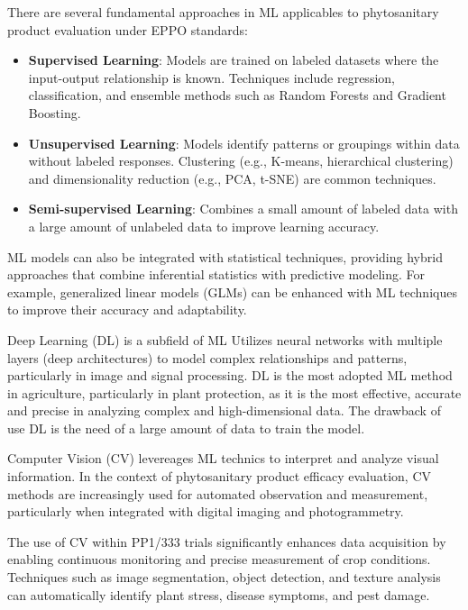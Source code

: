 \documentclass[12pt,a4paper,oneside]{report}
\begin{document}
There are several fundamental approaches in ML applicables to phytosanitary product
evaluation under EPPO standards:

\begin{itemize}
    \item \textbf{Supervised Learning}: Models are trained on labeled datasets where 
    the input-output relationship is known. Techniques include regression, classification, 
    and ensemble methods such as Random Forests and Gradient Boosting.
    \item \textbf{Unsupervised Learning}: Models identify patterns or groupings within 
    data without labeled responses. Clustering (e.g., K-means, hierarchical clustering) 
    and dimensionality reduction (e.g., PCA, t-SNE) are common techniques.
    \item \textbf{Semi-supervised Learning}: Combines a small amount of labeled data with 
    a large amount of unlabeled data to improve learning accuracy.
\end{itemize}

ML models can also be integrated with statistical techniques, providing hybrid approaches that 
combine inferential statistics with predictive modeling. For example, generalized linear models 
(GLMs) can be enhanced with ML techniques to improve their accuracy and adaptability.

Deep Learning (DL) is a subfield of ML Utilizes neural networks with multiple layers 
(deep architectures) to model complex relationships and patterns, particularly 
in image and signal processing.
DL is the most adopted ML method in agriculture, particularly in plant protection,
as it is the most effective, accurate and precise in analyzing complex and high-dimensional data.
The drawback of use DL is the need of a large amount of data to train the model.

Computer Vision (CV) levereages ML technics to interpret and analyze 
visual information. In the context of phytosanitary product efficacy evaluation, CV
methods are increasingly used for automated observation and measurement, particularly when 
integrated with digital imaging and photogrammetry.

The use of CV within PP1/333 trials significantly enhances data acquisition by 
enabling continuous monitoring and precise measurement of crop conditions. Techniques such as 
image segmentation, object detection, and texture analysis can automatically identify plant 
stress, disease symptoms, and pest damage.
\end{document}
